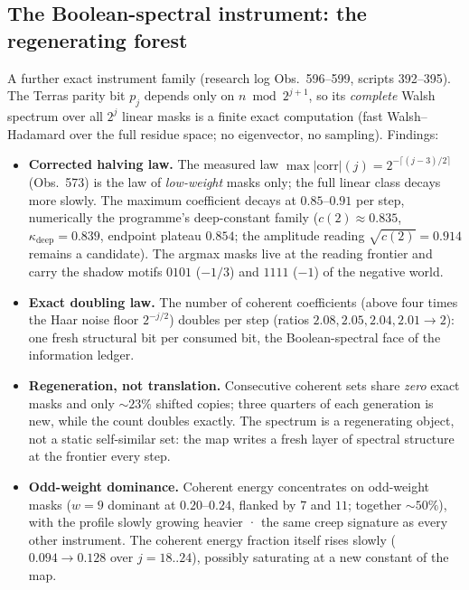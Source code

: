 \documentclass[11pt]{article}
\theoremstyle{definition}
\begin{document}
\subsection{The Boolean-spectral instrument: the regenerating forest}
\label{sec:walsh}

A further exact instrument family (research log Obs.~596--599, scripts
392--395). The Terras parity bit $p_j$ depends only on $n \bmod 2^{j+1}$,
so its \emph{complete} Walsh spectrum over all $2^{j}$ linear masks is a
finite exact computation (fast Walsh--Hadamard over the full residue space;
no eigenvector, no sampling). Findings:

\begin{itemize}
\item \textbf{Corrected halving law.} The measured law
$\max|\mathrm{corr}|(j) = 2^{-\lceil (j-3)/2 \rceil}$ (Obs.~573) is the law
of \emph{low-weight} masks only; the full linear class decays more slowly.
The maximum coefficient decays at $0.85$--$0.91$ per step, numerically the
programme's deep-constant family ($c(2) \approx 0.835$,
$\kappa_{\mathrm{deep}} = 0.839$, endpoint plateau $0.854$; the amplitude
reading $\sqrt{c(2)} = 0.914$ remains a candidate). The argmax masks live
at the reading frontier and carry the shadow motifs $0101$ ($-1/3$) and
$1111$ ($-1$) of the negative world.
\item \textbf{Exact doubling law.} The number of coherent coefficients
(above four times the Haar noise floor $2^{-j/2}$) doubles per step
(ratios $2.08, 2.05, 2.04, 2.01 \to 2$): one fresh structural bit per
consumed bit, the Boolean-spectral face of the information ledger.
\item \textbf{Regeneration, not translation.} Consecutive coherent sets
share \emph{zero} exact masks and only $\sim 23\%$ shifted copies; three
quarters of each generation is new, while the count doubles exactly. The
spectrum is a regenerating object, not a static self-similar set: the map
writes a fresh layer of spectral structure at the frontier every step.
\item \textbf{Odd-weight dominance.} Coherent energy concentrates on
odd-weight masks ($w = 9$ dominant at $0.20$--$0.24$, flanked by $7$ and
$11$; together $\sim 50\%$), with the profile slowly growing heavier ·
the same creep signature as every other instrument. The coherent energy
fraction itself rises slowly ($0.094 \to 0.128$ over $j = 18..24$),
possibly saturating at a new constant of the map.
\end{itemize}
\end{document}
